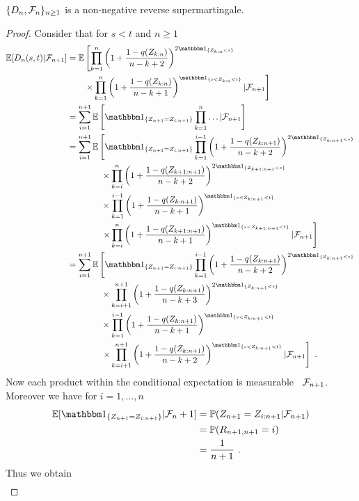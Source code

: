 %
\begin{lemma} \label{lem:dn_supermart}
	$\{D_n, \mathcal{F}_n\}_{n\geq 1}$ is a non-negative reverse supermartingale.
	\begin{proof}
		Consider that for $s<t$ and $n\geq 1$
		\begin{align*}
			\E[D_n(s,t)| \F_{n+1}] &= \E\left[\prod_{k=1}^{n}\left(1+\frac{1-q(Z_{k:n})}{n-k+2}\right)^{2\I{Z_{k:n} <s}}\right.\\
			&\qquad \left. \times \prod_{k=1}^{n}\left(1+\frac{1-q(Z_{k:n})}{n-k+1}\right)^\I{s < Z_{k:n} < t} | \F_{n+1}\right]\\
			&= \sum_{i=1}^{n+1}\E\left[\I{Z_{n+1} = Z_{i:n+1}} \prod_{k=1}^{n}\dots | \F_{n+1}\right]\\
			&= \sum_{i=1}^{n+1}\E\left[\I{Z_{n+1} = Z_{i:n+1}} \prod_{k=1}^{i-1}\left(1+\frac{1-q(Z_{k:n+1})}{n-k+2}\right)^{2\I{Z_{k:n+1} <s}} \right.\\
			&\qquad\qquad \times \prod_{k=i}^{n}\left(1+\frac{1-q(Z_{k+1:n+1})}{n-k+2}\right)^{2\I{Z_{k+1:n+1} <s}}\\
			&\qquad\qquad \times \prod_{k=1}^{i-1}\left(1+\frac{1-q(Z_{k:n+1})}{n-k+1}\right)^\I{s < Z_{k:n+1} < t}\\
			&\qquad\qquad \left. \times \prod_{k=i}^{n}\left(1+\frac{1-q(Z_{k+1:n+1})}{n-k+1}\right)^\I{s < Z_{k+1:n+1} < t}| \F_{n+1}\right]\\
			&= \sum_{i=1}^{n+1}\E\left[\I{Z_{n+1} = Z_{i:n+1}} \prod_{k=1}^{i-1}\left(1+\frac{1-q(Z_{k:n+1})}{n-k+2}\right)^{2\I{Z_{k:n+1} <s}} \right.\\
			&\qquad\qquad \times \prod_{k=i+1}^{n+1}\left(1+\frac{1-q(Z_{k:n+1})}{n-k+3}\right)^{2\I{Z_{k:n+1} <s}}\\
			&\qquad\qquad \times \prod_{k=1}^{i-1}\left(1+\frac{1-q(Z_{k:n+1})}{n-k+1}\right)^\I{s < Z_{k:n+1} < t}\\
			&\qquad\qquad \left. \times \prod_{k=i+1}^{n+1}\left(1+\frac{1-q(Z_{k:n+1})}{n-k+2}\right)^\I{s < Z_{k:n+1} < t}| \F_{n+1}\right]\mdot
		\end{align*}
		Now each product within the conditional expectation is measurable \wrt\ $\mathcal{F}_{n+1}$. Moreover we have for $i=1,\dots,n$ 
		\begin{align*}
			\E[\I{Z_{n+1}=Z_{i:n+1}}|\F_n+1] &= \P(Z_{n+1}=Z_{i:n+1}|\F_{n+1})\\
			&= \P(R_{n+1,n+1} = i)\\
			&= \frac{1}{n+1}\mdot
		\end{align*}
		Thus we obtain
		\begin{align*}

\end{align*}
\end{proof}
\end{lemma}
